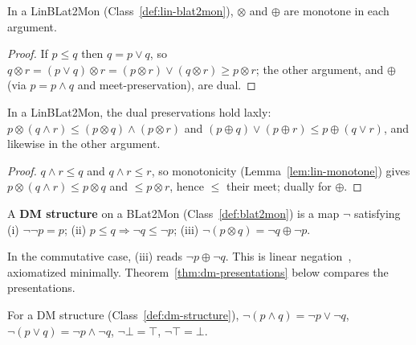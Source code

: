 \begin{lemma}
\label{lem:lin-monotone}
\leanok
In a LinBLat2Mon (Class~\ref{def:lin-blat2mon}), $\otimes$ and
$\oplus$ are monotone in each argument.
\end{lemma}

\begin{proof}
\leanok
If $p \le q$ then $q = p \vee q$, so
$q \otimes r = (p \vee q) \otimes r = (p \otimes r) \vee (q \otimes r) \ge
p \otimes r$; the other argument, and $\oplus$ (via $p = p \wedge q$ and
meet-preservation), are dual.
\end{proof}

\begin{lemma}
\label{lem:lin-lax-duals}
\leanok
In a LinBLat2Mon, the dual preservations hold laxly:
$p \otimes (q \wedge r) \le (p \otimes q) \wedge (p \otimes r)$ and
$(p \oplus q) \vee (p \oplus r) \le p \oplus (q \vee r)$, and likewise in
the other argument.
\end{lemma}

\begin{proof}
\leanok
$q \wedge r \le q$ and $q \wedge r \le r$, so monotonicity
(Lemma~\ref{lem:lin-monotone}) gives $p \otimes (q \wedge r) \le p \otimes q$
and $\le p \otimes r$, hence $\le$ their meet; dually for $\oplus$.
\end{proof}

\begin{class}
\label{def:dm-structure}
\leanok
A \textbf{DM structure} on a BLat2Mon (Class~\ref{def:blat2mon})
is a map $\neg$ satisfying (i) $\neg\neg p = p$; (ii)
$p \le q \Rightarrow \neg q \le \neg p$; (iii)
$\neg(p \otimes q) = \neg q \oplus \neg p$.
\end{class}

In the commutative case, (iii) reads $\neg p \oplus \neg q$. This is
linear negation~\citep{girardLinearLogic1987}, axiomatized minimally.
Theorem~\ref{thm:dm-presentations} below compares the presentations.

\begin{lemma}
\label{lem:dm-lattice-laws}
\leanok
For a DM structure (Class~\ref{def:dm-structure}),
$\neg(p \wedge q) = \neg p \vee \neg q$,
$\neg(p \vee q) = \neg p \wedge \neg q$, $\neg\bot = \top$,
$\neg\top = \bot$.
\end{lemma}

